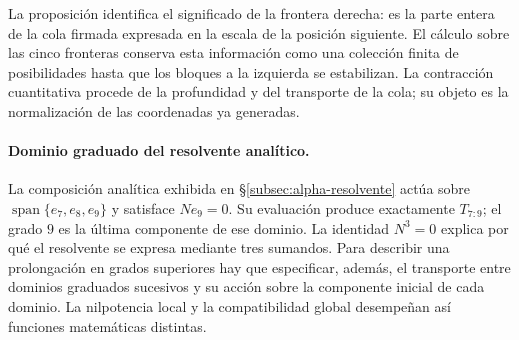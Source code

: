 La proposición identifica el significado de la frontera derecha: es la
parte entera de la cola firmada expresada en la escala de la posición
siguiente. El cálculo sobre las cinco fronteras conserva esta información
como una colección finita de posibilidades hasta que los bloques a la
izquierda se estabilizan. La contracción cuantitativa procede de la
profundidad y del transporte de la cola; su objeto es la normalización de
las coordenadas ya generadas.

\paragraph{Dominio graduado del resolvente analítico.}
\label{ampl-alfa-dominio-resolvente}
La composición analítica exhibida en
\S\ref{subsec:alpha-resolvente} actúa sobre
$\operatorname{span}\{e_7,e_8,e_9\}$ y satisface $Ne_9=0$. Su
evaluación produce exactamente $T_{7:9}$; el grado $9$ es la última
componente de ese dominio. La identidad $N^3=0$ explica por qué el
resolvente se expresa mediante tres sumandos. Para describir una
prolongación en grados superiores hay que especificar, además, el
transporte entre dominios graduados sucesivos y su acción sobre la
componente inicial de cada dominio. La nilpotencia local y la
compatibilidad global desempeñan así funciones matemáticas distintas.
